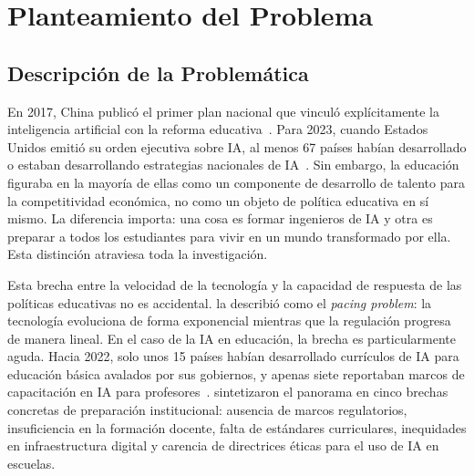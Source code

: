 \chapter{Planteamiento del Problema}
\label{cap:planteamiento}



\section{Descripción de la Problemática}
\label{sec:problematica}

En 2017, China publicó el primer plan nacional que vinculó explícitamente la inteligencia artificial con la reforma educativa~\citep{china2017ai}. Para 2023, cuando Estados Unidos emitió su orden ejecutiva sobre IA, al menos 67 países habían desarrollado o estaban desarrollando estrategias nacionales de IA~\citep{unesco2023genai}. Sin embargo, la educación figuraba en la mayoría de ellas como un componente de desarrollo de talento para la competitividad económica, no como un objeto de política educativa en sí mismo. La diferencia importa: una cosa es formar ingenieros de IA y otra es preparar a todos los estudiantes para vivir en un mundo transformado por ella. Esta distinción atraviesa toda la investigación.

Esta brecha entre la velocidad de la tecnología y la capacidad de respuesta de las políticas educativas no es accidental. \citet{thierer2018pacing} la describió como el \textit{pacing problem}: la tecnología evoluciona de forma exponencial mientras que la regulación progresa de manera lineal. En el caso de la IA en educación, la brecha es particularmente aguda. Hacia 2022, solo unos 15 países habían desarrollado currículos de IA para educación básica avalados por sus gobiernos, y apenas siete reportaban marcos de capacitación en IA para profesores~\citep{unesco2023genai}. \citet{miao2021guidance} sintetizaron el panorama en cinco brechas concretas de preparación institucional: ausencia de marcos regulatorios, insuficiencia en la formación docente, falta de estándares curriculares, inequidades en infraestructura digital y carencia de directrices éticas para el uso de IA en escuelas.

